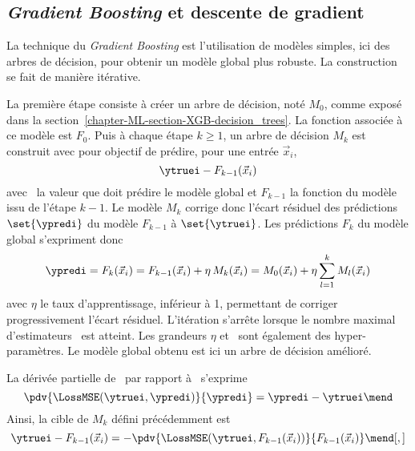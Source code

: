 \subsection{\emph{Gradient Boosting} et descente de gradient}\label{chapter-ML-section-XGB-grad_boost}
La technique du \emph{Gradient Boosting} est
l'utilisation de modèles simples,
ici des arbres de décision,
pour obtenir un modèle global plus robuste.
La construction se fait de manière itérative.
\par
La première étape consiste à créer un arbre de décision, noté $M_0$, comme exposé dans la section~\ref{chapter-ML-section-XGB-decision_trees}.
La fonction associée à ce modèle est $F_0$.
Puis à chaque étape $k\geq1$,
un arbre de décision $M_k$ est construit avec pour objectif de prédire,
pour une entrée $\vec{x}_i$,
\begin{equation}
\ytruei - F_{k-1}(\vec{x}_i)
\end{equation}
avec
\ytruei\ la valeur que doit prédire le modèle global %
et
$F_{k-1}$ la fonction du modèle issu de l'étape ${k-1}$.
Le modèle $M_k$ corrige donc l'écart résiduel des prédictions $\set{\ypredi}$ du modèle $F_{k-1}$ à $\set{\ytruei}$.
Les prédictions $F_k$ du modèle global s'expriment donc
\begin{equation}
\ypredi
=
F_k(\vec{x}_i)
=
F_{k-1}(\vec{x}_i) + \eta\,M_k(\vec{x}_i)
=
M_0(\vec{x}_i) + \eta \sum_{l=1}^{k} M_l(\vec{x}_i)
\end{equation}
avec
$\eta$ le taux d'apprentissage, inférieur à 1, permettant de corriger progressivement l'écart résiduel.
L'itération s'arrête lorsque le nombre maximal d'estimateurs \Nestimators\ est atteint.
Les grandeurs $\eta$ et \Nestimators\ sont également des hyper-paramètres.
Le modèle global obtenu est ici un arbre de décision amélioré.
\par
La dérivée partielle de \LossMSE\
par rapport à \ypredi\
s'exprime
\begin{equation}
\pdv{\LossMSE(\ytruei, \ypredi)}{\ypredi} = \ypredi - \ytruei
\mend
\end{equation}
Ainsi, la cible de $M_k$ défini précédemment est
\begin{equation}
\ytruei - F_{k-1}(\vec{x}_i)
=
- \pdv{\LossMSE(\ytruei, F_{k-1}(\vec{x}_i))}{F_{k-1}(\vec{x}_i)}
\mend[,]
\end{equation}
